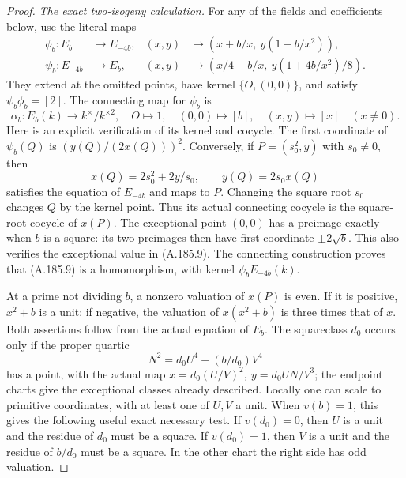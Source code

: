\begin{proof}
\emph{The exact two-isogeny calculation.}
For any of the fields and coefficients below, use the literal maps
\[
\begin{aligned}
 \phi_b:E_b&\longrightarrow E_{-4b},
 &(x,y)&\longmapsto(x+b/x,\ y(1-b/x^2)),\\
 \psi_b:E_{-4b}&\longrightarrow E_b,
 &(x,y)&\longmapsto(x/4-b/x,\ y(1+4b/x^2)/8).
\end{aligned}
\tag{A.185.8}
\]
They extend at the omitted points, have kernel \(\{O,(0,0)\}\),
and satisfy \(\psi_b\phi_b=[2]\).  The connecting map for
\(\psi_b\) is
\[
 \alpha_b:E_b(k)\longrightarrow k^\times/k^{\times2},
 \quad O\longmapsto1,\quad(0,0)\longmapsto[b],
 \quad(x,y)\longmapsto[x]\quad(x\ne0).
\tag{A.185.9}
\]
Here is an explicit verification of its kernel and cocycle.
The first coordinate of \(\psi_b(Q)\) is
\((y(Q)/(2x(Q)))^2\).  Conversely, if \(P=(s_0^2,y)\) with
\(s_0\ne0\), then
\[
 x(Q)=2s_0^2+2y/s_0,\qquad y(Q)=2s_0x(Q)
\tag{A.185.10}
\]
satisfies the equation of \(E_{-4b}\) and maps to \(P\).
Changing the square root \(s_0\) changes \(Q\) by the kernel
point.  Thus its actual connecting cocycle is the square-root
cocycle of \(x(P)\).  The exceptional point \((0,0)\) has a
preimage exactly when \(b\) is a square: its two preimages then
have first coordinate \(\pm2\sqrt b\).  This also verifies the
exceptional value in (A.185.9).  The connecting construction proves
that (A.185.9) is a homomorphism, with kernel \(\psi_bE_{-4b}(k)\).

At a prime not dividing \(b\), a nonzero valuation of \(x(P)\)
is even.  If it is positive, \(x^2+b\) is a unit; if negative,
the valuation of \(x(x^2+b)\) is three times that of \(x\).
Both assertions follow from the actual equation of \(E_b\).
The squareclass \(d_0\) occurs only if the proper quartic
\[
       N^2=d_0U^4+(b/d_0)V^4
\tag{A.185.11}
\]
has a point, with the actual map
\(x=d_0(U/V)^2,\ y=d_0UN/V^3\); the endpoint charts give
the exceptional classes already described.  Locally one can
scale to primitive coordinates, with at least one of \(U,V\)
a unit.  When \(v(b)=1\), this gives the following useful exact
necessary test.  If \(v(d_0)=0\), then \(U\) is a unit and
the residue of \(d_0\) must be a square.  If \(v(d_0)=1\),
then \(V\) is a unit and the residue of \(b/d_0\) must be a
square.  In the other chart the right side has odd valuation.


\end{proof}
